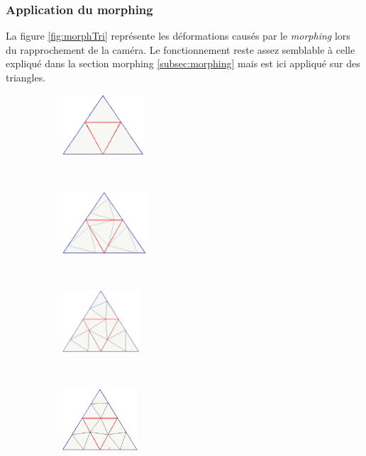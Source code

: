 	
  \subsubsection{Application du morphing}
  La figure \ref{fig:morphTri} représente les déformations causés par le \textit{morphing} lors du rapprochement de la caméra. Le fonctionnement reste assez semblable à celle expliqué dans la section morphing \ref{subsec:morphing} mais est ici appliqué sur des triangles.
  	
\begin{figure}[H]
    \centering
    \begin{subfigure}[b]{0.17\textwidth}
       \centering \includegraphics[width=\textwidth,height=2.25cm]{img/morph5.png}
       \caption{}\label{subfig:morph5}
    \end{subfigure}
    ~ 
    \begin{subfigure}[b]{0.17\textwidth}
       \centering \includegraphics[width=\textwidth,height=2.3cm]{img/morph4.png}
       \caption{}\label{subfig:morph4}
    \end{subfigure}
    ~
    \begin{subfigure}[b]{0.17\textwidth}
       \centering \includegraphics[width=\textwidth,height=2.3cm]{img/morph3.png}
       \caption{}\label{subfig:morph3}
    \end{subfigure}
    ~
    \begin{subfigure}[b]{0.16\textwidth}
       \centering \includegraphics[width=\textwidth,height=2.3cm]{img/morph2.png}

\end{subfigure}
\end{figure}
